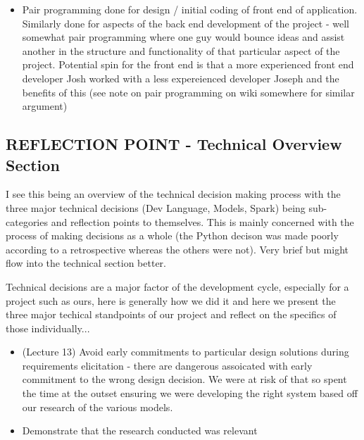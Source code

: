 \documentclass{l3proj}
\begin{document}
\begin{itemize}
\item Pair programming done for design / initial coding of front end of application. Similarly done for aspects of the back end development of the project - well somewhat pair programming where one guy would bounce ideas and assist another in the structure and functionality of that particular aspect of the project. Potential spin for the front end is that a more experienced front end developer Josh worked with a less expereienced developer Joseph and the benefits of this (see note on pair programming on wiki somewhere for similar argument)
\end{itemize}


\subsection{REFLECTION POINT - Technical Overview Section}
\label{sec:techoverviewreflection}

I see this being an overview of the technical decision making process with the three major technical decisions (Dev Language, Models, Spark) being sub-categories and reflection points to themselves. This is mainly concerned with the process of making decisions as a whole (the Python decison was made poorly according to a retrospective whereas the others were not). Very brief but might flow into the technical section better.

Technical decisions are a major factor of the development cycle, especially for a project such as ours, here is generally how we did it and here we present the three major techical standpoints of our project and reflect on the specifics of those individually...

\begin{itemize}
\item (Lecture 13) Avoid early commitments to particular design solutions during requirements elicitation - there are dangerous assoicated with early commitment to the wrong design decision. We were at risk of that so spent the time at the outset ensuring we were developing the right system based off our research of the various models.
\item Demonstrate that the research conducted was relevant
\end{itemize}
\end{document}

